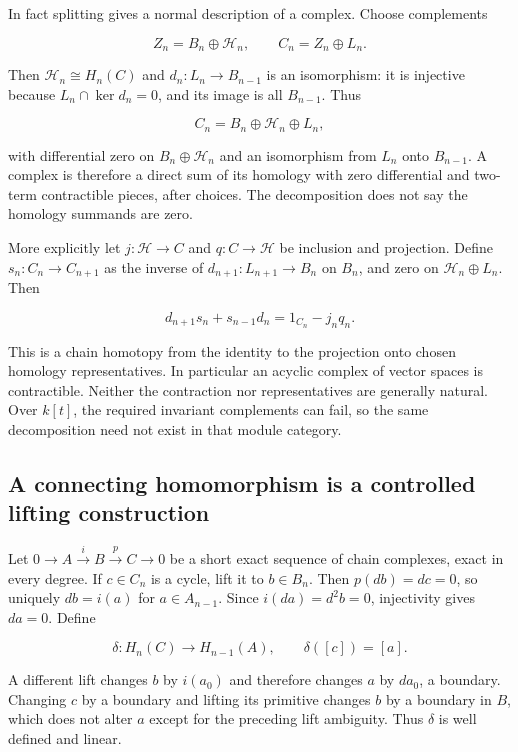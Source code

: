 \documentclass[
  11pt,
]{article}
\begin{document}
In fact splitting gives a normal description of a complex. Choose
complements

\[Z_n=B_n\oplus\mathcal H_n,\qquad
C_n=Z_n\oplus L_n.\]

Then \(\mathcal H_n\cong H_n(C)\) and \(d_n:L_n\to B_{n-1}\) is an
isomorphism: it is injective because \(L_n\cap\ker d_n=0\), and its
image is all \(B_{n-1}\). Thus

\[C_n=B_n\oplus\mathcal H_n\oplus L_n,\]

with differential zero on \(B_n\oplus\mathcal H_n\) and an isomorphism
from \(L_n\) onto \(B_{n-1}\). A complex is therefore a direct sum of
its homology with zero differential and two-term contractible pieces,
after choices. The decomposition does not say the homology summands are
zero.

More explicitly let \(j:\mathcal H\to C\) and \(q:C\to\mathcal H\) be
inclusion and projection. Define \(s_n:C_n\to C_{n+1}\) as the inverse
of \(d_{n+1}:L_{n+1}\to B_n\) on \(B_n\), and zero on
\(\mathcal H_n\oplus L_n\). Then

\[d_{n+1}s_n+s_{n-1}d_n=1_{C_n}-j_nq_n.\]

This is a chain homotopy from the identity to the projection onto chosen
homology representatives. In particular an acyclic complex of vector
spaces is contractible. Neither the contraction nor representatives are
generally natural. Over \(k[t]\), the required invariant complements can
fail, so the same decomposition need not exist in that module category.

\subsection{A connecting homomorphism is a controlled lifting
construction}\label{a-connecting-homomorphism-is-a-controlled-lifting-construction}

Let \(0\to A\xrightarrow{i}B\xrightarrow{p}C\to0\) be a short exact
sequence of chain complexes, exact in every degree. If \(c\in C_n\) is a
cycle, lift it to \(b\in B_n\). Then \(p(d b)=d c=0\), so uniquely
\(d b=i(a)\) for \(a\in A_{n-1}\). Since \(i(d a)=d^2b=0\), injectivity
gives \(d a=0\). Define

\[\delta:H_n(C)\to H_{n-1}(A),\qquad\delta([c])=[a].\]

A different lift changes \(b\) by \(i(a_0)\) and therefore changes \(a\)
by \(d a_0\), a boundary. Changing \(c\) by a boundary and lifting its
primitive changes \(b\) by a boundary in \(B\), which does not alter
\(a\) except for the preceding lift ambiguity. Thus \(\delta\) is well
defined and linear.
\end{document}
